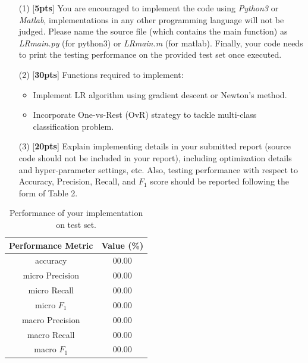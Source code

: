 \documentclass{article}
\begin{document}
\begin{enumerate}
    \item[(1)] [\textbf{5pts}] You are encouraged to implement the code using \emph{Python3} or \emph{Matlab}, implementations in any other programming language will not be judged. Please name the source file (which contains the main function) as \emph{LR\underline{\hspace{0.5em}}main.py} (for python3) or \emph{LR\underline{\hspace{0.5em}}main.m} (for matlab). Finally, your code needs to print the testing performance on the provided test set once executed.

    \item[(2)] [\textbf{30pts}] Functions required to implement:
    \begin{itemize}
        \item Implement LR algorithm using gradient descent or Newton's method.
        \item Incorporate One-vs-Rest (OvR) strategy to tackle multi-class classification problem.
    \end{itemize}
    \item[(3)] [\textbf{20pts}] Explain implementing details in your submitted report (source code should not be included in your report), including optimization details and hyper-parameter settings, etc. Also, testing performance with respect to Accuracy, Precision, Recall, and $F_1$ score should be reported following the form of Table 2.
\end{enumerate}

\begin{table}[h]
    \centering
     \caption{Performance of your implementation on test set.}
     \vspace{2mm}
    \label{tab:my_label}
    \begin{tabular}{|c|c|}
       \hline
       Performance Metric & Value (\%) \\
       \hline
       accuracy & 00.00 \\
       \hline
       micro Precision  & 00.00\\
       \hline
       micro Recall & 00.00\\
       \hline
       micro $F_1$ & 00.00\\
       \hline
       macro Precision  & 00.00\\
       \hline
       macro Recall & 00.00\\
       \hline
       macro $F_1$ & 00.00\\
       \hline
    \end{tabular}

\end{table}
\end{document}
